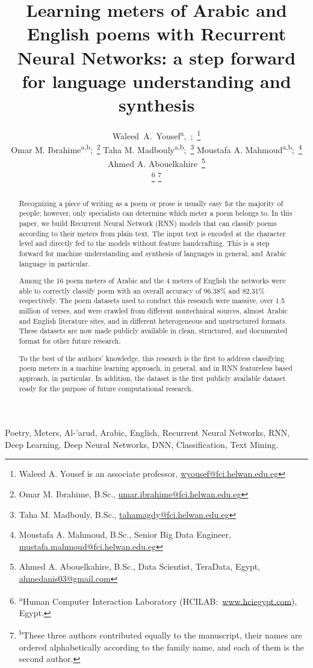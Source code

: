 \title{Learning meters of Arabic and English poems with Recurrent Neural Networks: a step forward
  for language understanding and synthesis}

\author{%
  Waleed~A.~Yousef\textsuperscript{a},~;~\thanks{Waleed
    A. Yousef is an associate professor, \url{wyousef@fci.helwan.edu.eg}}

  Omar M. Ibrahime\textsuperscript{a,b};~\thanks{Omar M. Ibrahime, B.Sc., \url{umar.ibrahime@fci.helwan.edu.eg}}
  Taha M. Madbouly\textsuperscript{a,b};~\thanks{Taha M. Madbouly, B.Sc., \url{tahamagdy@fci.helwan.edu.eg}} %
  Moustafa A. Mahmoud\textsuperscript{a,b};~\thanks{Moustafa A. Mahmoud, B.Sc., Senior Big Data Engineer, \url{mustafa.mahmoud@fci.helwan.edu.eg}}

  Ahmed A. Abouelkahire~\thanks{Ahmed A. Abouelkahire, B.Sc., Data Scientist, TeraData, Egypt,
    \url{ahmedanis03@gmail.com}}%

  \thanks{\textsuperscript{a}Human Computer Interaction Laboratory (HCILAB:\
    \url{www.hciegypt.com}), Egypt.}
  \thanks{\textsuperscript{b}These three authors contributed equally
    to the manuscript, their names are ordered alphabetically according to the family name, and each
    of them is the second author.}
}

\maketitle

\begin{abstract}
  Recognizing a piece of writing as a poem or prose is usually easy for the majority of people; however,
  only specialists can determine which meter a poem belongs to. In this paper, we build Recurrent
  Neural Network (RNN) models that can classify poems according to their meters from plain text. The
  input text is encoded at the character level and directly fed to the models without feature
  handcrafting. This is a step forward for machine understanding and synthesis of languages in
  general, and Arabic language in particular.

  Among the 16 poem meters of Arabic and the 4 meters of English the networks were able to correctly
  classify poem with an overall accuracy of 96.38\% and 82.31\% respectively. The poem datasets used to
  conduct this research were massive, over 1.5 million of verses, and were crawled from different
  nontechnical sources, almost Arabic and English literature sites, and in different heterogeneous
  and unstructured formats. These datasets are now made publicly available in clean, structured, and
  documented format for other future research.

  To the best of the authors' knowledge, this research is the first to address classifying poem
  meters in a machine learning approach, in general, and in RNN featureless based approach, in
  particular. In addition, the dataset is the first publicly available dataset ready for the purpose
  of future computational research.
\end{abstract}

\begin{IEEEkeywords}
  Poetry, Meters, Al-'arud, Arabic, English, Recurrent Neural Networks, RNN, Deep Learning, Deep Neural
  Networks, DNN, Classification, Text Mining.
\end{IEEEkeywords}
